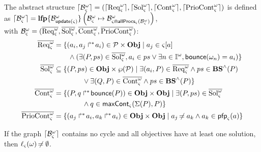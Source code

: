 \begin{definition}
  \label{def:aS}
  The abstract structure $\lceil \mathcal{B}_\varsigma^\omega\rceil=(\lceil \mathrm{Req}^\omega_\varsigma\rceil,\lceil \mathrm{Sol}^\omega_\varsigma\rceil,\lceil \mathrm{Cont}^\omega_\varsigma\rceil,\lceil \mathrm{PrioCont}^\omega_\varsigma\rceil)$ is defined as
  $\lceil \mathcal{B}_\varsigma^\omega\rceil = \mathbf{lfp}\{\mathcal{B}^\omega_{\mathsf{update}(\varsigma)}\}\left(\mathcal{B}^\omega_\varsigma\mapsto\mathcal{B}^\omega_{\varsigma \Cap \mathsf{allProcs}_\varsigma(\mathcal{B}^\omega_\varsigma)}\right)$,\\
  with $\mathcal{B}^\omega_\varsigma=(\overline{\mathrm{Req}^\omega_\varsigma},\overline{\mathrm{Sol}^\omega_\varsigma},\overline{\mathrm{Cont}^\omega_\varsigma},\overline{\mathrm{PrioCont}^\omega_\varsigma})$:
  \begin{align*}
    \myreq &= \{ (a_i,\PHobjp{a}{j}{i}) \in \PHproc \times \Obj \mid
      a_j \in \PHget{\ctx}{a} \\ %
      & \qquad \wedge (\exists (P,ps) \in \mysol, a_i \in ps \vee \exists n \in \indexes{\w}, \PHbounce(\w_n)=a_i) \}
    \\
    \mysol &\subseteq \{ (P,ps) \in \Obj \times \powerset(\PHproc) \mid
            \exists (a_i, P) \in \myreq \wedge ps \in \aBS(P) \\
      & \qquad\qquad \vee \exists (Q, P) \in \mycont \wedge ps \in \aBS(P) \}
    \\
    \mycont & = \{ (P, \PHobj{q}{\PHbounce(P)}) \in \Obj \times \Obj \mid
      \exists (P, ps) \in \mysol \\
      & \qquad\qquad \wedge q \in \gCont_\ctx(\PHsort(P),P) \}
    \\
    \mysat & = \{ (\PHobjp{a}{j}{i}, \PHobjp{a}{k}{i}) \in \Obj \times \Obj \mid
      a_j \neq a_k \wedge a_k \in \pfp_\ctx(a) \}
  \end{align*}
\end{definition}

\begin{theorem}\label{th:approxinf}
If the graph $\lceil \mathcal{B}_\varsigma^\omega\rceil$ contains no cycle and all objectives have at least one solution, then $\ell_\varsigma(\omega) \not\nobreak\mkern -2mu = \emptyset$.
\end{theorem}

